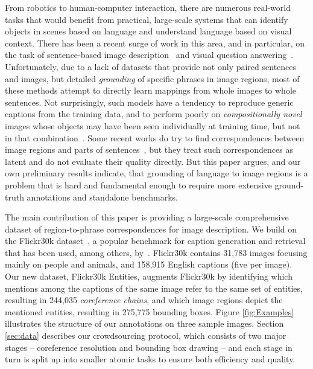 \documentclass[twocolumn]{svjour3}
\begin{document}
From robotics to human-computer interaction, there are numerous real-world tasks that would benefit from practical, large-scale systems that can identify objects in scenes based on language and understand language based on visual context. There has been a recent surge of work in this area, and in particular, on the task of sentence-based image description~\citep{chen2014learning,donahue2014long,fang2014captions,Farhadi10,Hodosh13,karpathy2014deep,kiros2014unifying,klein2014fisher,Kulkarni11,lebret2015phrase,mao2014deep,Ordonez11,vinyals2014show,Yao2010} and visual question answering~\citep{VQA,gao2015mQA,krishnavisualgenome,malinowski2014nips,ren_cocoqa,VisualMadlibs}. Unfortunately, due to a lack of datasets that provide not only paired sentences and images, but detailed {\em grounding} of specific phrases in image regions, most of these methods attempt to directly learn mappings from whole images to whole sentences. Not surprisingly, such models have a tendency to reproduce generic captions from the training data, and to perform poorly on {\em compositionally novel} images whose objects may have been seen individually at training time, but not in that combination~\citep{Devlin15}. Some recent works do try to find correspondences between image regions and parts of sentences~\citep{fang2014captions,karpathy2014deepNIPS,karpathy2014deep,xu2015show}, but they treat such correspondences as latent and do not evaluate their quality directly. But this paper argues, and our own preliminary results indicate, that grounding of language to image regions is a problem that is hard and fundamental enough to require more extensive ground-truth annotations and standalone benchmarks. 



The main contribution of this paper is providing a large-scale comprehensive dataset of region-to-phrase correspondences for image description. We build on the Flickr30k dataset~\citep{young2014image}, a popular benchmark for caption generation and retrieval that has been used, among others, by~\cite{chen2014learning,donahue2014long,fang2014captions,gong2014improving,karpathy2014deepNIPS,karpathy2014deep,kiros2014unifying,klein2014fisher,lebret2015phrase,mao2014deep,vinyals2014show,xu2015show}.  Flickr30k contains 31,783 images focusing mainly on people and animals, and 158,915 English captions (five per image). Our new dataset, Flickr30k Entities, augments Flickr30k by identifying which mentions among the captions of the same image refer to the same set of entities, resulting in 244,035 {\em coreference chains}, and which image regions depict the mentioned entities, resulting in 275,775 bounding boxes. Figure \ref{fig:Examples} illustrates the structure of our annotations on three sample images. Section \ref{sec:data} describes our crowdsourcing protocol, which consists of two major stages -- coreference resolution and bounding box drawing -- and each stage in turn is split up into smaller atomic tasks to ensure both efficiency and quality.
\end{document}
